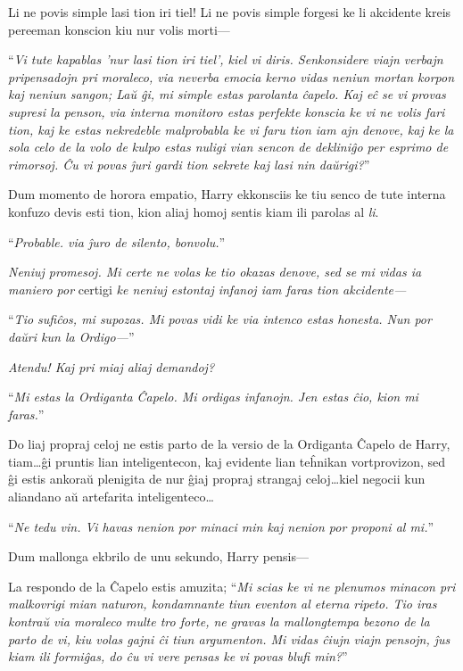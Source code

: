 Li ne povis simple lasi tion iri tiel! Li ne povis simple forgesi ke
li akcidente kreis pereeman konscion kiu nur volis morti—

``\emph{Vi tute kapablas 'nur lasi tion iri tiel', kiel vi
  diris. Senkonsidere viajn verbajn pripensadojn pri moraleco, via
  neverba emocia kerno vidas neniun mortan korpon kaj neniun sangon;
  Laŭ ĝi, mi simple estas parolanta ĉapelo. Kaj eĉ se vi provas
  supresi la penson, via interna monitoro estas perfekte konscia ke vi
  ne volis fari tion, kaj ke estas nekredeble malprobabla ke vi faru
  tion iam ajn denove, kaj ke la sola celo de la volo de kulpo estas
  nuligi vian sencon de dekliniĝo per esprimo de rimorsoj. Ĉu vi povas
  ĵuri gardi tion sekrete kaj lasi nin daŭrigi?}''


Dum momento de horora empatio, Harry ekkonsciis ke tiu senco de tute
interna konfuzo devis esti tion, kion aliaj homoj sentis kiam ili
parolas al \emph{li}.

``\emph{Probable. via ĵuro de silento, bonvolu.}''

\emph{Neniuj promesoj. Mi certe ne volas ke tio okazas denove, sed se
mi vidas ia maniero por} certigi \emph{ke neniuj estontaj infanoj iam
faras tion akcidente—}

``\emph{Tio sufiĉos, mi supozas. Mi povas vidi ke via intenco estas
honesta. Nun por daŭri kun la Ordigo—}''

\emph{Atendu! Kaj pri miaj aliaj demandoj?}

``\emph{Mi estas la Ordiganta Ĉapelo. Mi ordigas infanojn. Jen estas
  ĉio, kion mi faras.}''

Do liaj propraj celoj ne estis parto de la versio de la Ordiganta Ĉapelo
de Harry, tiam\ldots ĝi pruntis lian inteligentecon, kaj evidente lian
teĥnikan vortprovizon, sed ĝi estis ankoraŭ plenigita de nur ĝiaj
propraj strangaj celoj\ldots kiel negocii kun aliandano aŭ artefarita
inteligenteco\ldots

``\emph{Ne tedu vin. Vi havas nenion por minaci min kaj nenion por
  proponi al mi.}''

Dum mallonga ekbrilo de unu sekundo, Harry pensis—

La respondo de la Ĉapelo estis amuzita; ``\emph{Mi scias ke vi ne
  plenumos minacon pri malkovrigi mian naturon, kondamnante tiun
  eventon al eterna ripeto. Tio iras kontraŭ via moraleco multe tro
  forte, ne gravas la mallongtempa bezono de la parto de vi, kiu volas
  gajni ĉi tiun argumenton. Mi vidas ĉiujn viajn pensojn, ĵus kiam ili
  formiĝas, do ĉu vi vere pensas ke vi povas blufi min?}''

